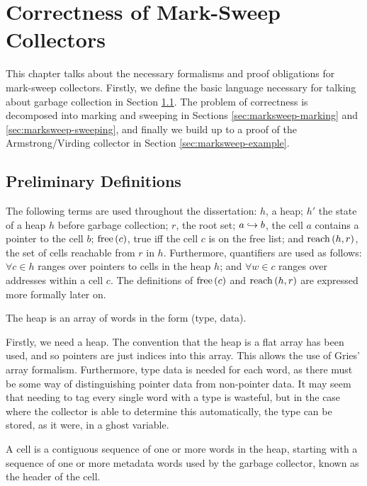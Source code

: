 \chapter{Correctness of Mark-Sweep Collectors}
\label{sec:marksweep}

This chapter talks about the necessary formalisms and proof
obligations for mark-sweep collectors. Firstly, we define the basic
language necessary for talking about garbage collection in Section
\ref{sec:marksweep-defns}. The problem of correctness is decomposed
into marking and sweeping in Sections \ref{sec:marksweep-marking} and
\ref{sec:marksweep-sweeping}, and finally we build up to a proof of
the Armstrong/Virding\cite{Armstrong95} collector in Section
\ref{sec:marksweep-example}.

\section{Preliminary Definitions}
\label{sec:marksweep-defns}

The following terms are used throughout the dissertation: $h$, a heap;
$h'$ the state of a heap $h$ before garbage collection; $r$, the root
set; $a \hookrightarrow b$, the cell $a$ contains a pointer to the cell $b$;
$\mathrm{free}\left(c\right)$, true iff the cell $c$ is on the free list; and
$\mathrm{reach}\left(h, r\right)$, the set of cells reachable from $r$ in
$h$. Furthermore, quantifiers are used as follows: $\forall c \in h$
ranges over pointers to cells in the heap $h$; and $\forall w \in c$
ranges over addresses within a cell $c$. The definitions of $\mathrm{free}\left(c\right)$
and $\mathrm{reach}\left(h, r\right)$ are expressed more formally later on.

\begin{definition}[Heap]
  \label{def:ms-heap}
  The heap is an array of words in the form (type, data).
\end{definition}

Firstly, we need a heap. The convention that the heap is a flat array
has been used, and so pointers are just indices into this array. This
allows the use of Gries' array formalism\cite{Gries87}. Furthermore,
type data is needed for each word, as there must be some way of
distinguishing pointer data from non-pointer data. It may seem that
needing to tag every single word with a type is wasteful, but in the
case where the collector is able to determine this automatically, the
type can be stored, as it were, in a ghost variable.

\begin{definition}[Cell]
  \label{def:ms-cell}
  A cell is a contiguous sequence of one or more words in the heap,
  starting with a sequence of one or more metadata words used by the
  garbage collector, known as the header of the cell.
\end{definition}

